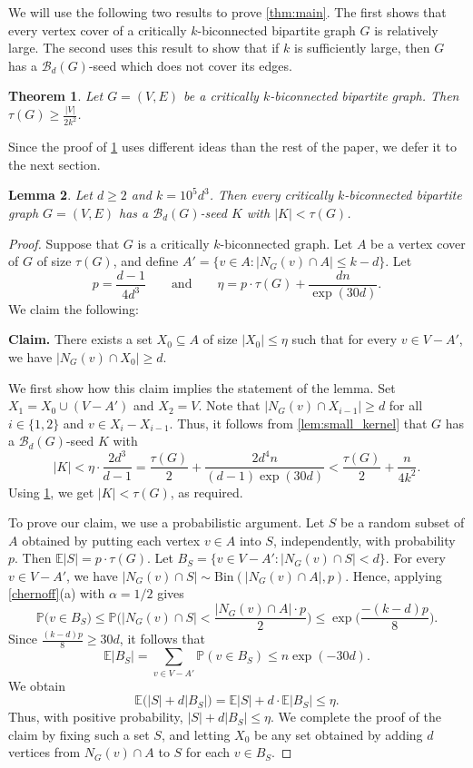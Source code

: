 \documentclass[11pt,a4paper,dvipsnames]{scrartcl}
\newtheorem{theorem}{Theorem}[section]
\newtheorem{lemma}[theorem]{Lemma}
\newcommand{\cB}{{\mathcal{B}}}
\newcommand{\E}{\mathbb{E}}
\newcommand{\Prob}{\mathbb{P}}
\begin{document}
We will use the following two results to prove  \cref{thm:main}. The first shows that every vertex cover of a critically $k$-biconnected bipartite graph $G$ is relatively large. 
The second uses this result to show that if $k$ is sufficiently large, then $G$ has a $\cB_d(G)$-seed which does not cover its edges.


\begin{theorem}\label{lem:tau_bound}
    Let $G=(V,E)$ be a critically $k$-biconnected bipartite graph.
    Then $\tau(G)\geq \frac{|V|}{2k^2}$.
\end{theorem}

Since the proof of \cref{lem:tau_bound} uses different ideas than the rest of the paper, we defer it to the next section.



\begin{lemma}\label{lem:existsk}
    Let $d\geq 2$ and $k=10^5d^3$. Then every critically $k$-biconnected bipartite graph $G=(V,E)$ has a $\cB_d(G)$-seed $K$ with $|K|< \tau (G)$.
\end{lemma}
\begin{proof}
    Suppose that $G$ is a critically $k$-biconnected graph.
    Let $A$ be a vertex cover of $G$ of size $\tau(G)$, and define $A'=\{v\in A:|N_G(v)\cap A|\leq k-d\}.$
 Let $$p=\frac{d-1}{4d^3}\;\;\;\;\;\;  \text{ and }\;\;\; \;\;\; \eta=p\cdot \tau(G)+\frac{dn}{\exp(30d)}.$$ We claim the following:\medskip
 
\noindent \textbf{Claim.}    There exists a set $X_0\subseteq A$ of size $|X_0|\leq \eta$
        such that for every $v\in V-A'$, we have $|N_G(v)\cap X_0|\geq d$.\medskip
 
   We first show how this claim implies the statement of the lemma.
    Set $X_1=X_0\cup (V-A')$ and $X_2=V$. Note that $|N_G(v)\cap X_{i-1}|\geq d$ for all  $i\in \{1,2\}$ and $v\in X_i-X_{i-1}$.
    Thus, it follows from \cref{lem:small_kernel} that $G$ has a  $\cB_d(G)$-seed $K$ with
    \[ |K|< \eta\cdot \frac{2d^3}{d-1}= \frac{\tau(G)}{2}+\frac{2d^4n}{(d-1)\exp({30d})}< \frac{\tau(G)}{2}+\frac{n}{4k^2}. \]
    Using \cref{lem:tau_bound}, we get $|K|<\tau(G)$, as required.

    To prove our claim, we use a probabilistic argument.
    Let $S$ be a random subset of $A$ obtained by putting each vertex $v\in A$ into $S$, independently,  with probability $p$. Then $\E|S|=p\cdot \tau(G)$. Let $B_{S}=\{v\in V-A': |N_G(v)\cap S|< d\}$. For every $v\in V-A'$, we have $|N_G(v)\cap S|\sim {\mathrm{Bin}}(|N_G(v)\cap A|,p)$. Hence, applying  \cref{chernoff}(a) with $\alpha = 1/2$ gives
    $$ \Prob\big(v\in B_S)
    \leq \Prob\Big(|N_G(v)\cap S|<\frac{|N_G(v)\cap A|\cdot p}{2}\Big)\leq \exp\Big(\frac{-(k-d)p}{8}\Big).$$
        Since $\frac{(k-d)p}{8}\geq 30d$, it follows that $$\E|B_{S}|=\sum_{v\in V-A'}\Prob(v\in B_{S})\leq  n\exp({-30d}).$$
        We obtain
        $$\E\big(|S|+d|B_{S}|\big)=\E|S|+d\cdot\E|B_{S}|\leq \eta.$$
        Thus, with positive probability, $|S|+d|B_{S}|\leq \eta$. 
         We complete the proof of the claim by fixing such a set $S$, and letting $X_0$ be any set obtained by adding $d$ vertices from $N_G(v) \cap A$ to $S$ for each $v\in B_{S}$.
\end{proof}
\end{document}
